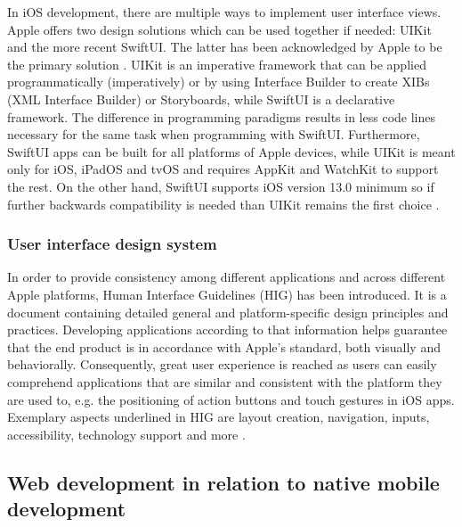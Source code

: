 In iOS development, there are multiple ways to implement user interface views. Apple offers two design solutions which can be used together if needed: UIKit and the more recent SwiftUI. The latter has been acknowledged by Apple to be the primary solution \cite{comparison_technologies_multiplatform}. UIKit is an imperative framework that can be applied programmatically (imperatively) or by using Interface Builder to create XIBs (XML Interface Builder) or Storyboards, while SwiftUI is a declarative framework. The difference in programming paradigms results in less code lines necessary for the same task when programming with SwiftUI. Furthermore, SwiftUI apps can be built for all platforms of Apple devices, while UIKit is meant only for iOS, iPadOS and tvOS and requires AppKit and WatchKit to support the rest. On the other hand, SwiftUI supports iOS version 13.0 minimum so if further backwards compatibility is needed than UIKit remains the first choice \cite{swiftui_overview,xib_why_use,swiftui_uikit}.

\subsubsection*{User interface design system}

In order to provide consistency among different applications and across different Apple platforms, Human Interface Guidelines (HIG) has been introduced. It is a document containing detailed general and platform-specific design principles and practices. Developing applications according to that information helps guarantee that the end product is in accordance with Apple's standard, both visually and behaviorally. Consequently, great user experience is reached as users can easily comprehend applications that are similar and consistent with the platform they are used to, e.g. the positioning of action buttons and touch gestures in iOS apps. Exemplary aspects underlined in HIG are layout creation, navigation, inputs, accessibility, technology support and more \cite{hig_overview}.

\subsection{Web development in relation to native mobile development}

